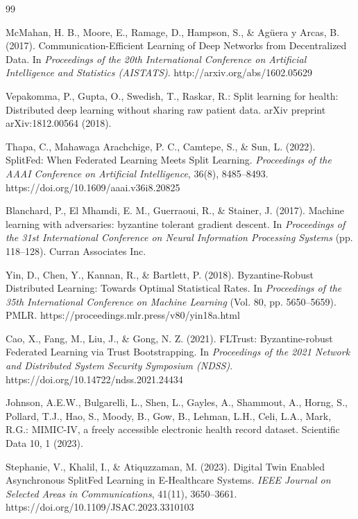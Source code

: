 \documentclass[pdflatex,sn-mathphys-num]{sn-jnl}
\begin{document}
\begin{thebibliography}{99}

McMahan, H. B., Moore, E., Ramage, D., Hampson, S., \& Agüera y Arcas, B. (2017). Communication-Efficient Learning of Deep Networks from Decentralized Data. In \textit{Proceedings of the 20th International Conference on Artificial Intelligence and Statistics (AISTATS)}. http://arxiv.org/abs/1602.05629

Vepakomma, P., Gupta, O., Swedish, T., Raskar, R.: Split learning for health: Distributed deep learning without sharing raw patient data. arXiv preprint arXiv:1812.00564 (2018).

Thapa, C., Mahawaga Arachchige, P. C., Camtepe, S., \& Sun, L. (2022). SplitFed: When Federated Learning Meets Split Learning. \textit{Proceedings of the AAAI Conference on Artificial Intelligence}, 36(8), 8485--8493. https://doi.org/10.1609/aaai.v36i8.20825

Blanchard, P., El Mhamdi, E. M., Guerraoui, R., \& Stainer, J. (2017). Machine learning with adversaries: byzantine tolerant gradient descent. In \textit{Proceedings of the 31st International Conference on Neural Information Processing Systems} (pp. 118--128). Curran Associates Inc.

Yin, D., Chen, Y., Kannan, R., \& Bartlett, P. (2018). Byzantine-Robust Distributed Learning: Towards Optimal Statistical Rates. In \textit{Proceedings of the 35th International Conference on Machine Learning} (Vol. 80, pp. 5650--5659). PMLR. https://proceedings.mlr.press/v80/yin18a.html

Cao, X., Fang, M., Liu, J., \& Gong, N. Z. (2021). FLTrust: Byzantine-robust Federated Learning via Trust Bootstrapping. In \textit{Proceedings of the 2021 Network and Distributed System Security Symposium (NDSS)}. https://doi.org/10.14722/ndss.2021.24434

Johnson, A.E.W., Bulgarelli, L., Shen, L., Gayles, A., Shammout, A., Horng, S., Pollard, T.J., Hao, S., Moody, B., Gow, B., Lehman, L.H., Celi, L.A., Mark, R.G.: MIMIC-IV, a freely accessible electronic health record dataset. Scientific Data 10, 1 (2023).


Stephanie, V., Khalil, I., \& Atiquzzaman, M. (2023). Digital Twin Enabled Asynchronous SplitFed Learning in E-Healthcare Systems. \textit{IEEE Journal on Selected Areas in Communications}, 41(11), 3650--3661. https://doi.org/10.1109/JSAC.2023.3310103


\end{thebibliography}
\end{document}
